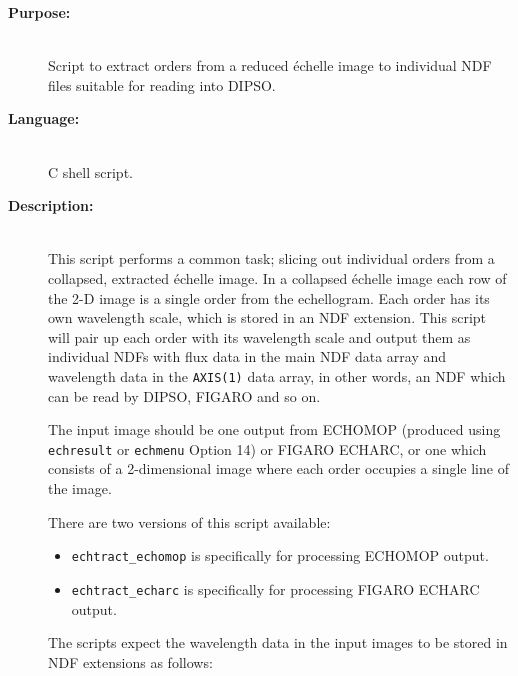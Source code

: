 \documentclass[twoside,11pt]{article}
\newcommand{\xref}[3]{#1}
\renewcommand{\_}{\texttt{\symbol{95}}}
\begin{document}
\begin{description}

\item [{\bf Purpose:}] \mbox{} \\
     Script to extract orders from a reduced \'{e}chelle image to
     individual NDF files suitable for reading into \xref{DIPSO}{sun50}{}.

\item [{\bf Language:}] \mbox{} \\
     C shell script.

\item [{\bf Description:}] \mbox{} \\
     This script performs a common task; slicing out individual orders
     from a collapsed, extracted \'{e}chelle image.  In a collapsed \'{e}chelle
     image each row of the 2-D image is a single order from the
     echellogram.   Each order has its own wavelength scale, which is
     stored in an \xref{NDF}{sun33}{} \xref{extension}{sun33}{extensions}.
     This script will pair up each order
     with its wavelength scale and output them as individual NDFs with
     flux data in the main NDF data array and wavelength data in the
     \verb+AXIS(1)+ data array, in other words, an NDF which can be read
     by DIPSO, \xref{FIGARO}{sun86}{} and so on.

     The input image should be one output from \xref{ECHOMOP}{sun152}{}
     (produced using \xref{{\tt ech\_result}}{sun152}{ech_result} or
     \xref{{\tt echmenu} Option 14}{sun152}{option14}) or FIGARO
     \xref{ECHARC}{sun86}{ECHARC}, or one which consists of a
     2-dimensional image where each order occupies a single line of the
     image.

     There are two versions of this script available:

\begin{itemize}

\item \verb+echtract_echomop+ is specifically for processing ECHOMOP
      output.

\item \verb+echtract_echarc+ is specifically for processing FIGARO ECHARC
      output.

\end{itemize}

     The scripts expect the wavelength data in the input images to be stored
     in NDF extensions as follows:

\begin{itemize}


\end{itemize}
\end{description}
\end{document}
